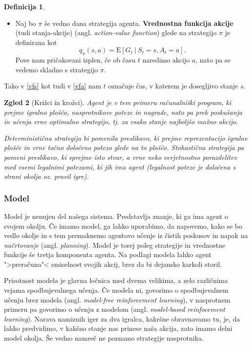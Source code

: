 \documentclass[12pt,a4paper]{amsart}
\theoremstyle{definition} %
\newtheorem{definicija}{Definicija}[section]
\theoremstyle{plain} %
\newtheorem{zgled}[definicija]{Zgled}
\begin{document}
\begin{definicija}
\begin{itemize}
        \item Naj bo $\pi$ še vedno dana strategija agenta. \textbf{Vrednostna funkcija 
                akcije} (tudi stanja-akcije) (angl. \textit{action-value function}) glede na 
                strategijo $\pi$ je definirana kot
                \begin{equation}\label{vfa}
                q_\pi(s, a) = \mathrm{E} [G_t~|~S_t = s, A_t = a].  
                \end{equation}
                Pove nam pričakovani izplen, če ob času $t$ naredimo akcijo $a$, nato pa se 
                vedemo skladno s strategijo $\pi$.
    \end{itemize}
    Tako v \eqref{vfs} kot tudi v \eqref{vfa} nam $t$ označuje čas, v katerem je dosegljivo stanje $s$.
\end{definicija}

\begin{zgled}[Križci in krožci]
    Agent je v tem primeru računalniški program, ki prejme igralno ploščo, nasprotnikove 
    poteze in nagrade, nato pa prek poskušanja in učenja vrne optimalno strategijo, tj. 
    za vsako stanje najboljšo možno akcijo.

    Deterministična strategija bi pomenila preslikavo, ki prejme reprezentacijo igralne plošče
    in vrne točno določeno potezo glede na to ploščo. Stohastična strategija pa pomeni preslikavo, 
    ki sprejme isto stvar, a vrne neko verjetnostno porazdelitev med vsemi legalnimi potezami, 
    ki jih ima agent (legalnost poteze je določena s strani okolja oz. pravil igre).
\end{zgled}

\subsubsection{Model}
Model je nenujen del našega sistema. Predstavlja znanje, ki ga ima agent o svojem okolju. 
Če imamo model, ga lahko uporabimo, da napovemo, kako se bo vedlo okolje in s tem premaknemo
agentovo učenje iz čistih poskusov in napak na \textit{načrtovanje} (angl. \textit{planning}).
Model je torej poleg strategije in vrednostne funkcije še tretja komponenta agenta. Na podlagi 
modela lahko agent ">preračuna"< smiselnost svojih akcij, brez da bi dejansko karkoli storil. 

Prisotnost modela je glavna ločnica med dvema velikima, a zelo različnima vejama spodbujevalnega
učenja. Če modela ni, govorimo o spodbujevalnem učenju brez modela (angl. \textit{model-free 
reinforcement learning}), v nasprotnem primeru pa govorimo o učenju z modelom (angl. \textit
{model-based reinfocement learning}). Narava namiznih iger za dva igralca, kakršne obravnavamo tu,
je, da lahko predvidimo, v kakšno stanje nas prinese naša akcija, zato imamo delni model okolja. 
Še vedno namreč ne poznamo strategije nasprotnika.
\end{document}
